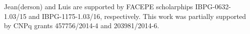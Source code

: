 \documentclass[conference]{IEEEtran}
\begin{document}
Jean(derson) and Luis are supported by FACEPE scholarphips
IBPG-0632-1.03/15 and IBPG-1175-1.03/16, respectively.  This work was
partially supported by CNPq grants 457756/2014-4 and 203981/2014-6.


%
%
%

\balance



\end{document}
